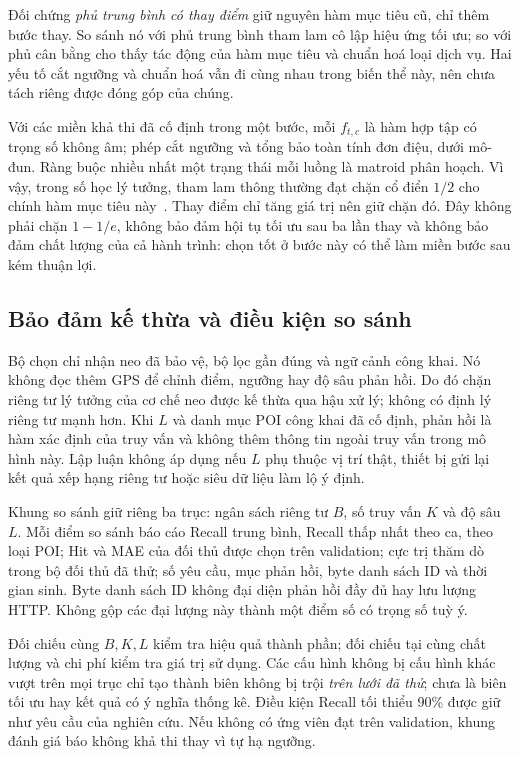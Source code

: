 Đối chứng \emph{phủ trung bình có thay điểm} giữ nguyên hàm mục tiêu cũ, chỉ thêm bước thay. So sánh nó với phủ trung bình tham lam cô lập hiệu ứng tối ưu; so với phủ cân bằng cho thấy tác động của hàm mục tiêu và chuẩn hoá loại dịch vụ. Hai yếu tố cắt ngưỡng và chuẩn hoá vẫn đi cùng nhau trong biến thể này, nên chưa tách riêng được đóng góp của chúng.

Với các miền khả thi đã cố định trong một bước, mỗi $f_{t,c}$ là hàm hợp tập có trọng số không âm; phép cắt ngưỡng và tổng bảo toàn tính đơn điệu, dưới mô-đun. Ràng buộc nhiều nhất một trạng thái mỗi luồng là matroid phân hoạch. Vì vậy, trong số học lý tưởng, tham lam thông thường đạt chặn cổ điển $1/2$ cho chính hàm mục tiêu này~\cite{calinescu2011matroid}. Thay điểm chỉ tăng giá trị nên giữ chặn đó. Đây không phải chặn $1-1/e$, không bảo đảm hội tụ tối ưu sau ba lần thay và không bảo đảm chất lượng của cả hành trình: chọn tốt ở bước này có thể làm miền bước sau kém thuận lợi.

\subsection{Bảo đảm kế thừa và điều kiện so sánh}

Bộ chọn chỉ nhận neo đã bảo vệ, bộ lọc gần đúng và ngữ cảnh công khai. Nó không đọc thêm GPS để chỉnh điểm, ngưỡng hay độ sâu phản hồi. Do đó chặn riêng tư lý tưởng của cơ chế neo được kế thừa qua hậu xử lý; không có định lý riêng tư mạnh hơn. Khi $L$ và danh mục POI công khai đã cố định, phản hồi là hàm xác định của truy vấn và không thêm thông tin ngoài truy vấn trong mô hình này. Lập luận không áp dụng nếu $L$ phụ thuộc vị trí thật, thiết bị gửi lại kết quả xếp hạng riêng tư hoặc siêu dữ liệu làm lộ ý định.

Khung so sánh giữ riêng ba trục: ngân sách riêng tư $B$, số truy vấn $K$ và độ sâu $L$. Mỗi điểm so sánh báo cáo Recall trung bình, Recall thấp nhất theo ca, theo loại POI; Hit và MAE của đối thủ được chọn trên validation; cực trị thăm dò trong bộ đối thủ đã thử; số yêu cầu, mục phản hồi, byte danh sách ID và thời gian sinh. Byte danh sách ID không đại diện phản hồi đầy đủ hay lưu lượng HTTP. Không gộp các đại lượng này thành một điểm số có trọng số tuỳ ý.

Đối chiếu cùng $B,K,L$ kiểm tra hiệu quả thành phần; đối chiếu tại cùng chất lượng và chi phí kiểm tra giá trị sử dụng. Các cấu hình không bị cấu hình khác vượt trên mọi trục chỉ tạo thành biên không bị trội \emph{trên lưới đã thử}; chưa là biên tối ưu hay kết quả có ý nghĩa thống kê. Điều kiện Recall tối thiểu 90\% được giữ như yêu cầu của nghiên cứu. Nếu không có ứng viên đạt trên validation, khung đánh giá báo không khả thi thay vì tự hạ ngưỡng.
